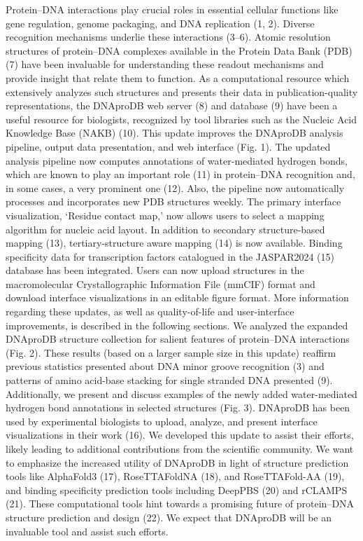 Protein–DNA interactions play crucial roles in essential cellular functions like gene regulation, genome packaging, and DNA replication (1, 2). Diverse recognition mechanisms underlie these interactions (3–6). Atomic resolution structures of protein–DNA complexes available in the Protein Data Bank (PDB) (7) have been invaluable for understanding these readout mechanisms and provide insight that relate them to function. As a computational resource which extensively analyzes such structures and presents their data in publication-quality representations, the DNAproDB web server (8) and database (9) have been a useful resource for biologists, recognized by tool libraries such as the Nucleic Acid Knowledge Base (NAKB) (10). 
This update improves the DNAproDB analysis pipeline, output data presentation, and web interface (Fig. 1). The updated analysis pipeline now computes annotations of water-mediated hydrogen bonds, which are known to play an important role (11) in protein–DNA recognition and, in some cases, a very prominent one (12). Also, the pipeline now automatically processes and incorporates new PDB structures weekly. The primary interface visualization, ‘Residue contact map,’ now allows users to select a mapping algorithm for nucleic acid layout. In addition to secondary structure-based mapping (13), tertiary-structure aware mapping (14) is now available. Binding specificity data for transcription factors catalogued in the JASPAR2024 (15) database has been integrated. Users can now upload structures in the macromolecular Crystallographic Information File (mmCIF) format and download interface visualizations in an editable figure format. More information regarding these updates, as well as quality-of-life and user-interface improvements, is described in the following sections.
We analyzed the expanded DNAproDB structure collection for salient features of protein–DNA interactions (Fig. 2). These results (based on a larger sample size in this update) reaffirm previous statistics presented about DNA minor groove recognition (3) and patterns of amino acid-base stacking for single stranded DNA presented (9). Additionally, we present and discuss examples of the newly added water-mediated hydrogen bond annotations in selected structures (Fig. 3).
DNAproDB has been used by experimental biologists to upload, analyze, and present interface visualizations in their work (16). We developed this update to assist their efforts, likely leading to additional contributions from the scientific community. We want to emphasize the increased utility of DNAproDB in light of structure prediction tools like AlphaFold3 (17), RoseTTAFoldNA (18), and RoseTTAFold-AA (19), and binding specificity prediction tools including DeepPBS (20) and rCLAMPS (21). These computational tools hint towards a promising future of protein–DNA structure prediction and design (22). We expect that DNAproDB will be an invaluable tool and assist such efforts.


